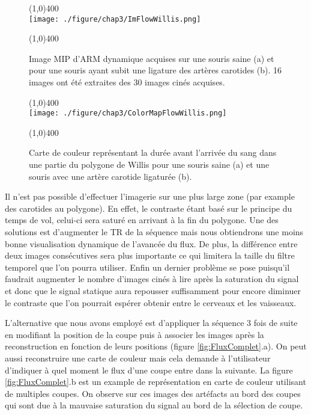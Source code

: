 \begin{figure}[H]
\centering \line(1,0){400} \\
\texttt{[image: ./figure/chap3/ImFlowWillis.png]}
\caption[Image d'ARM dynamique sur souris du polygone de Willis]{\label{fig:ImFlowWillis} Image MIP d'ARM dynamique acquises sur une souris saine (a) et pour une souris ayant subit une ligature des artères carotides (b). 16 images ont été extraites des 30 images cinés acquises.}
\line(1,0){400} \\ \end{figure}

\begin{figure}[H]
\centering \line(1,0){400} \\
\texttt{[image: ./figure/chap3/ColorMapFlowWillis.png]}
\caption[Image d'ARM dynamique sur souris du polygone de Willis]{\label{fig:ColorMapFlowWillis} Carte de couleur représentant la durée avant l'arrivée du sang dans une partie du polygone de Willis pour une souris saine (a) et une souris avec une artère carotide ligaturée (b).}
\line(1,0){400} \\ \end{figure}

Il n'est pas possible d'effectuer l'imagerie sur une plus large zone (par example des carotides au polygone). En effet, le contraste étant basé sur le principe du temps de vol, celui-ci sera saturé en arrivant à la fin du polygone. Une des solutions est d'augmenter le TR de la séquence mais nous obtiendrons une moins bonne visualisation dynamique de l'avancée du flux. De plus, la différence entre deux images consécutives sera plus importante ce qui limitera la taille du filtre temporel que l'on pourra utiliser. Enfin un dernier problème se pose puisqu'il faudrait augmenter le nombre d'images cinés à lire après la saturation du signal et donc que le signal statique aura repousser suffisamment pour encore diminuer le contraste que l'on pourrait espérer obtenir entre le cerveaux et les vaisseaux.

L'alternative que nous avons employé est d'appliquer la séquence 3 fois de suite en modifiant la position de la coupe puis à associer les images après la reconstruction en fonction de leurs positions (figure \ref{fig:FluxComplet}.a). On peut aussi reconstruire une carte de couleur mais cela demande à l'utilisateur d'indiquer à quel moment le flux d'une coupe entre dans la suivante. La figure \ref{fig:FluxComplet}.b est un example de représentation en carte de couleur utilisant de multiples coupes. On observe sur ces images des artéfacts au bord des coupes qui sont due à la mauvaise saturation du signal au bord de la sélection de coupe.

